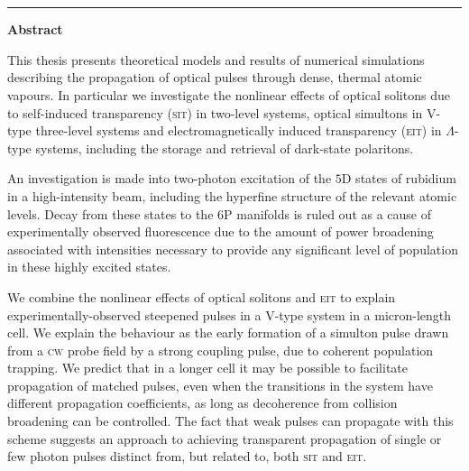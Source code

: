   \thispagestyle{empty}
  \vspace{-1cm}
  \begin{center}
  {\huge \textbf{\thesistitle}}
  \\
  \vspace{0.8cm} {\Large \textbf{\myname}\\\rule{7cm}{0.2mm}}
  \end{center}
  \vspace{0.6cm}
  {\large \textbf{Abstract}}

  \begin{small}
  This thesis presents theoretical models and results of numerical simulations
  describing the propagation of optical pulses through dense, thermal atomic
  vapours. In particular we investigate the nonlinear effects of optical
  solitons due to self-induced transparency (\textsc{sit}) in two-level systems,
  optical simultons in V-type three-level systems and electromagnetically
  induced transparency (\textsc{eit}) in $\Lambda$-type systems, including the
  storage and retrieval of dark-state polaritons.

  An investigation is made into two-photon excitation of the $5$D states of
  rubidium in a high-intensity beam, including the hyperfine structure of the
  relevant atomic levels. Decay from these states to the $6$P manifolds is ruled
  out as a cause of experimentally observed fluorescence due to the amount of
  power broadening associated with intensities necessary to provide any
  significant level of population in these highly excited states.

  We combine the nonlinear effects of optical solitons and \textsc{eit} to
  explain experimentally-observed steepened pulses in a V-type system in a
  micron-length cell. We explain the behaviour as the early formation of a
  simulton pulse drawn from a \textsc{cw} probe field by a strong coupling
  pulse, due to coherent population trapping. We predict that in a longer cell
  it may be possible to facilitate propagation of matched pulses, even when the
  transitions in the system have different propagation coefficients, as long as
  decoherence from collision broadening can be controlled. The fact that weak
  pulses can propagate with this scheme suggests an approach to achieving
  transparent propagation of single or few photon pulses distinct from, but
  related to, both \textsc{sit} and \textsc{eit}.

  \end{small}

  \newpage